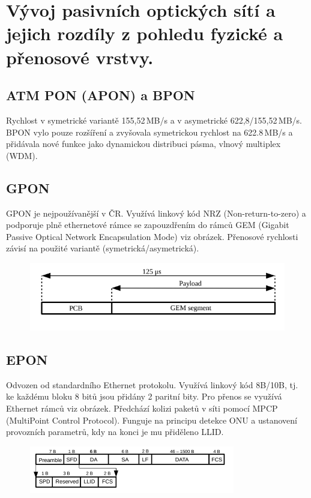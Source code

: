 \section{Vývoj pasivních optických sítí a jejich rozdíly z pohledu fyzické a přenosové vrstvy.}

\subsection{ATM PON (APON) a BPON}
Rychlost v symetrické variantě 155,52\,MB/s a v asymetrické 622,8/155,52\,MB/s. BPON vylo pouze rozšíření a zvyšovala symetrickou rychlost na 622.8\,MB/s a přidávala nové funkce jako dynamickou distribuci pásma, vlnový multiplex (WDM).

\subsection{GPON}
GPON je nejpoužívanější v ČR. Využívá linkový kód NRZ (Non-return-to-zero) a podporuje plně ethernetové rámce se zapouzdřením do rámců GEM (Gigabit Passive Optical Network Encapsulation Mode) viz obrázek. Přenosové rychlosti závisí na použité variantě (symetrická/asymetrická).

\begin{figure} [h]
    \centering
    \includegraphics[width=\textwidth]{snimky/gemFrame.png}
\end{figure}

\subsection{EPON}
Odvozen od standardního Ethernet protokolu. Využívá linkový kód 8B/10B, tj. ke každému bloku 8 bitů jsou přidány 2 paritní bity. Pro přenos se využívá Ethernet rámců viz obrázek. Předchází kolizi paketů v síti pomocí MPCP (MultiPoint Control Protocol). Funguje na principu detekce ONU a ustanovení provozních parametrů, kdy na konci je mu přiděleno LLID. 

\begin{figure} [h]
    \centering
    \includegraphics[width=0.8\textwidth]{snimky/EPONframe.png}
\end{figure}

